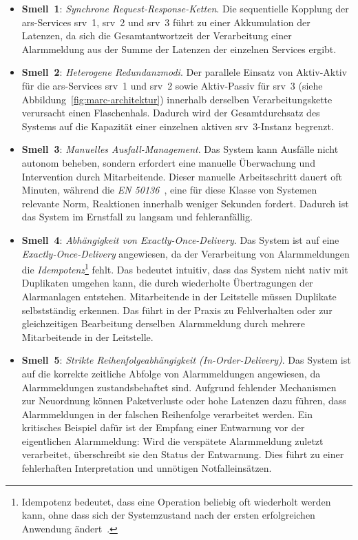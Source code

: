 \begin{itemize}
	\item \textbf{Smell~1}: \textit{Synchrone Request-Response-Ketten}. Die sequentielle Kopplung der \gls{ars}-Services \gls{srv}~1, \gls{srv}~2 und \gls{srv}~3 führt zu einer Akkumulation der Latenzen, da sich die Gesamtantwortzeit der Verarbeitung einer Alarmmeldung aus der Summe der Latenzen der einzelnen Services ergibt.

	\item \textbf{Smell~2}: \textit{Heterogene Redundanzmodi}. Der parallele Einsatz von Aktiv-Aktiv für die \gls{ars}-Services \gls{srv}~1 und \gls{srv}~2 sowie Aktiv-Passiv für \gls{srv}~3 (siehe Abbildung~\ref{fig:marc-architektur}) innerhalb derselben Verarbeitungskette verursacht einen Flaschenhals. Dadurch wird der Gesamtdurchsatz des Systems auf die Kapazität einer einzelnen aktiven \gls{srv}~3-Instanz begrenzt.

	\item \textbf{Smell~3}: \textit{Manuelles Ausfall-Management}. Das System kann Ausfälle nicht autonom beheben, sondern erfordert eine manuelle Überwachung und Intervention durch Mitarbeitende. Dieser manuelle Arbeitsschritt dauert oft Minuten, während die \textit{EN 50136}~\citep{din_en_50136-12012-08_alarm_2012}, eine für diese Klasse von Systemen relevante Norm, Reaktionen innerhalb weniger Sekunden fordert. Dadurch ist das System im Ernstfall zu langsam und fehleranfällig.

	\item \textbf{Smell~4}: \textit{Abhängigkeit von Exactly-Once-Delivery}. Das System ist auf eine \textit{Exactly-Once-Delivery} angewiesen, da der Verarbeitung von Alarmmeldungen die \textit{Idempotenz}\footnote{Idempotenz bedeutet, dass eine Operation beliebig oft wiederholt werden kann, ohne dass sich der Systemzustand nach der ersten erfolgreichen Anwendung ändert~\citep{helland2012idempotence}.} fehlt. Das bedeutet intuitiv, dass das System nicht nativ mit Duplikaten umgehen kann, die durch wiederholte Übertragungen der Alarmanlagen entstehen. Mitarbeitende in der Leitstelle müssen Duplikate selbstständig erkennen. Das führt in der Praxis zu Fehlverhalten oder zur gleichzeitigen Bearbeitung derselben Alarmmeldung durch mehrere Mitarbeitende in der Leitstelle.

	\item \textbf{Smell~5}: \textit{Strikte Reihenfolgeabhängigkeit (In-Order-Delivery)}. Das System ist auf die korrekte zeitliche Abfolge von Alarmmeldungen angewiesen, da Alarmmeldungen zustandsbehaftet sind. Aufgrund fehlender Mechanismen zur Neuordnung können Paketverluste oder hohe Latenzen dazu führen, dass Alarmmeldungen in der falschen Reihenfolge verarbeitet werden. Ein kritisches Beispiel dafür ist der Empfang einer Entwarnung vor der eigentlichen Alarmmeldung: Wird die verspätete Alarmmeldung zuletzt verarbeitet, überschreibt sie den Status der Entwarnung. Dies führt zu einer fehlerhaften Interpretation und unnötigen Notfalleinsätzen.
\end{itemize}

